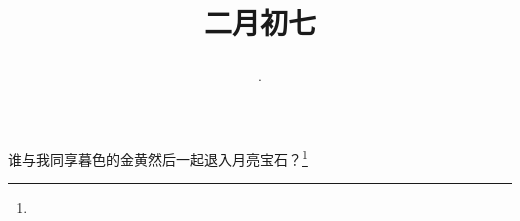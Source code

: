 \title{\date[d=16,m=3,y=2024][year:cn-y,年,month:cn,day:cn,日,·,weekday]·二月初七 }
谁与我同享暮色的金黄然后一起退入月亮宝石？\footnote{ }

